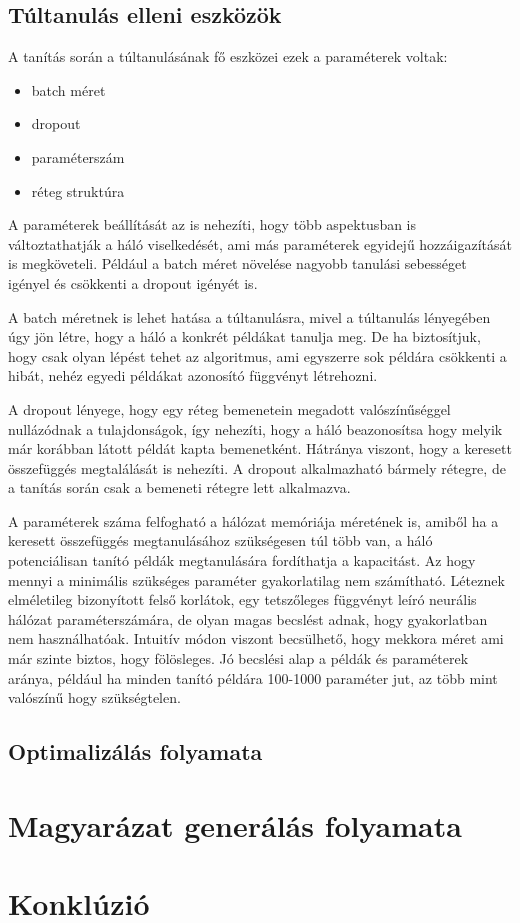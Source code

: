 \subsection{Túltanulás elleni eszközök}

A tanítás során a túltanulásának fő eszközei ezek a paraméterek voltak:
\begin{itemize}
    \item batch méret
    \item dropout
    \item paraméterszám
    \item réteg struktúra
\end{itemize}

A paraméterek beállítását az is nehezíti, hogy több aspektusban is változtathatják a háló viselkedését, ami más paraméterek egyidejű hozzáigazítását is megköveteli. Például a batch méret növelése nagyobb tanulási sebességet igényel és csökkenti a dropout igényét is.

A batch méretnek is lehet hatása a túltanulásra, mivel a túltanulás lényegében úgy jön létre, hogy a háló a konkrét példákat tanulja meg. De ha biztosítjuk, hogy csak olyan lépést tehet az algoritmus, ami egyszerre sok példára csökkenti a hibát, nehéz egyedi példákat azonosító függvényt létrehozni.

A dropout lényege, hogy egy réteg bemenetein megadott valószínűséggel nullázódnak a tulajdonságok, így nehezíti, hogy a háló beazonosítsa hogy melyik már korábban látott példát kapta bemenetként. Hátránya viszont, hogy a keresett összefüggés megtalálását is nehezíti. A dropout alkalmazható bármely rétegre, de a tanítás során csak a bemeneti rétegre lett alkalmazva.

A paraméterek száma felfogható a hálózat memóriája méretének is, amiből ha a keresett összefüggés megtanulásához szükségesen túl több van, a háló potenciálisan tanító példák megtanulására fordíthatja a kapacitást. Az hogy mennyi a minimális szükséges paraméter gyakorlatilag nem számítható. Léteznek elméletileg bizonyított felső korlátok, egy tetszőleges függvényt leíró neurális hálózat paraméterszámára, de olyan magas becslést adnak, hogy gyakorlatban nem használhatóak. Intuitív módon viszont becsülhető, hogy mekkora méret ami már szinte biztos, hogy fölösleges. Jó becslési alap a példák és paraméterek aránya, például ha minden tanító példára 100-1000 paraméter jut, az több mint valószínű hogy szükségtelen.

\subsection{Optimalizálás folyamata}




\section{Magyarázat generálás folyamata}

\section{Konklúzió}



